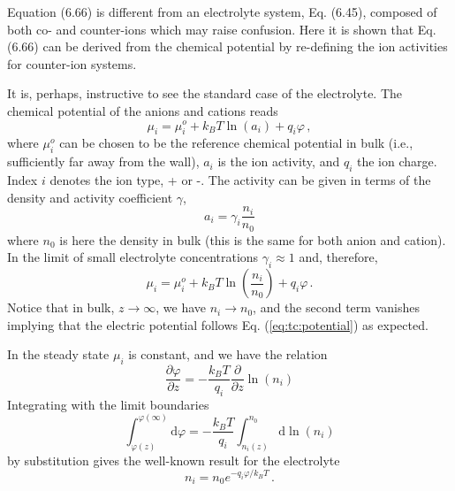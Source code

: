\documentclass[11pt]{article}
\renewcommand{\d}{\mathrm{d}}
\begin{document}
Equation (6.66) is different from an electrolyte system, Eq. (6.45), composed of both co- and 
counter-ions which may raise confusion. Here it is shown that Eq. (6.66) can be derived from the 
chemical potential by re-defining the ion activities for counter-ion systems.

It is, perhaps, instructive to see the standard case of the electrolyte. The chemical potential of 
the anions and cations reads
\begin{equation}
	\mu_i = \mu_i^o + k_BT\ln(a_i) + q_i\varphi \, ,
\end{equation}
where $\mu_i^o$ can be chosen to be the reference chemical potential in bulk (i.e., sufficiently 
far away from the wall), $a_i$ is the ion activity, and $q_i$ the ion         
charge. Index $i$ denotes the ion type, + or -. The activity can be given in terms of the 
density and activity coefficient $\gamma$, 
\begin{equation}
\label{eq:tc:activity0}
a_i = \gamma_i \frac{n_i}{n_0} 
\end{equation}
where $n_0$ is here the density in bulk (this is the same for both anion and cation). In the limit 
of small electrolyte concentrations $\gamma_i \approx 1$ and, therefore,
\begin{equation}
	\mu_i = \mu_i^o + k_BT\ln\left(\frac{n_i}{n_0}\right) + q_i\varphi \, .
\end{equation}
Notice that in bulk, $z \rightarrow \infty$, we have $n_i \rightarrow n_0$, and the second term 
vanishes implying that the electric potential follows Eq. (\ref{eq:tc:potential}) as expected. 

In the steady state $\mu_i$ is constant, and we have the relation 
\begin{equation}
	\frac{\partial \varphi}{\partial z} = -\frac{k_BT}{q_i}\frac{\partial}{\partial z} \ln (n_i)
\end{equation}
Integrating with the limit boundaries 
\begin{equation}
	\int_{\varphi(z)}^{\varphi(\infty)} \d \varphi = -\frac{k_BT}{q_i} \int_{n_i(z)}^{n_0} \d 
\ln(n_i)
\end{equation}
by substitution gives the well-known result for the electrolyte 
\begin{equation}
	n_i = n_0e^{-q_i\varphi/k_BT} \, .
\end{equation}
\end{document}
